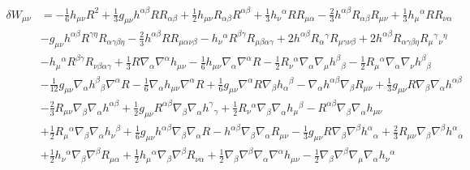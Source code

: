 \documentclass[10pt,letterpaper]{article}
\begin{document}
\begin{align*}
	\delta W_{\mu\nu} &=
- \tfrac{1}{6} h_{\mu \nu} R^2 + \tfrac{1}{3} g_{\mu \nu} h^{\alpha \beta} R R_{\alpha \beta} + \tfrac{1}{2} h_{\mu \nu} R_{\alpha \beta} R^{\alpha \beta} + \tfrac{1}{3} h_{\nu}{}^{\alpha} R R_{\mu \alpha} -  \tfrac{2}{3} h^{\alpha \beta} R_{\alpha \beta} R_{\mu \nu} + \tfrac{1}{3} h_{\mu}{}^{\alpha} R R_{\nu \alpha}\\
& -  g_{\mu \nu} h^{\alpha \beta} R^{\gamma \eta} R_{\alpha \gamma \beta \eta} -  \tfrac{2}{3} h^{\alpha \beta} R R_{\mu \alpha \nu \beta} -  h_{\nu}{}^{\alpha} R^{\beta \gamma} R_{\mu \beta \alpha \gamma} + 2 h^{\alpha \beta} R_{\alpha}{}^{\gamma} R_{\mu \gamma \nu \beta} + 2 h^{\alpha \beta} R_{\alpha \gamma \beta \eta} R_{\mu}{}^{\gamma}{}_{\nu}{}^{\eta}\\
& -  h_{\mu}{}^{\alpha} R^{\beta \gamma} R_{\nu \beta \alpha \gamma} + \tfrac{1}{3} R \nabla_{\alpha}\nabla^{\alpha}h_{\mu \nu} -  \tfrac{1}{6} h_{\mu \nu} \nabla_{\alpha}\nabla^{\alpha}R -  \tfrac{1}{2} R_{\nu}{}^{\alpha} \nabla_{\alpha}\nabla_{\mu}h^{\beta}{}_{\beta} -  \tfrac{1}{2} R_{\mu}{}^{\alpha} \nabla_{\alpha}\nabla_{\nu}h^{\beta}{}_{\beta}\\
& -  \tfrac{1}{12} g_{\mu \nu} \nabla_{\alpha}h^{\beta}{}_{\beta} \nabla^{\alpha}R -  \tfrac{1}{6} \nabla_{\alpha}h_{\mu \nu} \nabla^{\alpha}R + \tfrac{1}{6} g_{\mu \nu} \nabla^{\alpha}R \nabla_{\beta}h_{\alpha}{}^{\beta} -  \nabla_{\alpha}h^{\alpha \beta} \nabla_{\beta}R_{\mu \nu} + \tfrac{1}{3} g_{\mu \nu} R \nabla_{\beta}\nabla_{\alpha}h^{\alpha \beta}\\
& -  \tfrac{2}{3} R_{\mu \nu} \nabla_{\beta}\nabla_{\alpha}h^{\alpha \beta} + \tfrac{1}{2} g_{\mu \nu} R^{\alpha \beta} \nabla_{\beta}\nabla_{\alpha}h^{\gamma}{}_{\gamma} + \tfrac{1}{2} R_{\nu}{}^{\alpha} \nabla_{\beta}\nabla_{\alpha}h_{\mu}{}^{\beta} -  R^{\alpha \beta} \nabla_{\beta}\nabla_{\alpha}h_{\mu \nu}\\
&+ \tfrac{1}{2} R_{\mu}{}^{\alpha} \nabla_{\beta}\nabla_{\alpha}h_{\nu}{}^{\beta} + \tfrac{1}{6} g_{\mu \nu} h^{\alpha \beta} \nabla_{\beta}\nabla_{\alpha}R -  h^{\alpha \beta} \nabla_{\beta}\nabla_{\alpha}R_{\mu \nu} -  \tfrac{1}{3} g_{\mu \nu} R \nabla_{\beta}\nabla^{\beta}h^{\alpha}{}_{\alpha} + \tfrac{2}{3} R_{\mu \nu} \nabla_{\beta}\nabla^{\beta}h^{\alpha}{}_{\alpha}\\
& + \tfrac{1}{2} h_{\nu}{}^{\alpha} \nabla_{\beta}\nabla^{\beta}R_{\mu \alpha} + \tfrac{1}{2} h_{\mu}{}^{\alpha} \nabla_{\beta}\nabla^{\beta}R_{\nu \alpha} + \tfrac{1}{2} \nabla_{\beta}\nabla^{\beta}\nabla_{\alpha}\nabla^{\alpha}h_{\mu \nu} -  \tfrac{1}{2} \nabla_{\beta}\nabla^{\beta}\nabla_{\mu}\nabla_{\alpha}h_{\nu}{}^{\alpha}\\

\end{align*}
\end{document}
